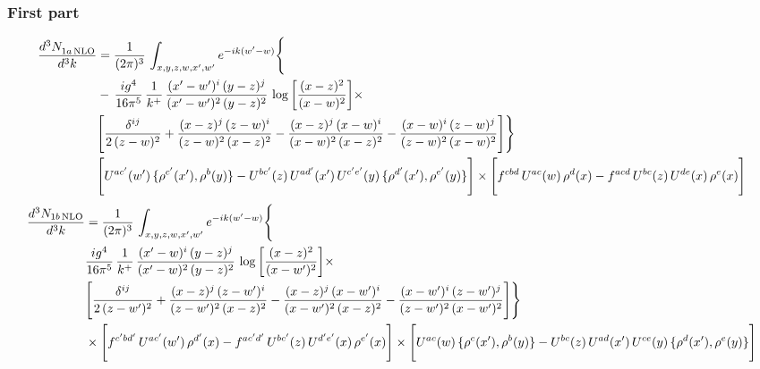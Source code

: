 \documentclass[9pt]{article}
\numberwithin{equation}{section}
\begin{document}
\subsubsection{First part}
\begin{align}
 \frac{d^{3}N_{1a\,\rm NLO}^{\rm}}{d^{3}k}  & =     \frac{1}{(2\pi)^{3}}\,\int_{x,y,z,w,x',w^{\prime}} e^{-ik(w^{\prime}-w)}\Bigg\{\notag \\
& -\, \frac{ig^{4}}{16\pi^{5}}\,\frac{1}{k^{+}}\, \frac{(x'-w')^{i}\,(y-z)^{j}}{(x'-w')^{2}\,(y-z)^{2}}\,\log{\left[\frac{(x-z)^{2}}{(x-w)^{2}}\right]}\times\notag \\ &  \Bigg[\frac{\delta^{ij}}{2\,(z-w)^{2}}+\frac{(x-z)^{j}\,(z-w)^{i}}{(z-w)^{2}\,(x-z)^{2}}-\frac{(x-z)^{j}\,(x-w)^{i}}{(x-w)^{2}\,(x-z)^{2}}-\frac{(x-w)^{i}\,(z-w)^{j}}{(z-w)^{2}\,(x-w)^{2}}\Bigg]\Bigg\} \notag \\ & \Bigg[U^{ac'}(w')\,\{\rho^{c'}(x'),\rho^{b}(y)\}-U^{bc'}(z)\,U^{ad'}(x')\,U^{c'e'}(y)\, \{\rho^{d'}(x'),\rho^{e'}(y)\}\Bigg]\times \Bigg[f^{cbd}\,U^{ac}(w)\,\rho^{d}(x)-f^{acd}\, U^{bc}(z)\,U^{de}(x)\,\rho^{e}(x)\Bigg]
\end{align}
\begin{align}
\frac{d^{3}N_{1b\, \rm NLO}}{d^{3}k} & =  \frac{1}{(2\pi)^{3}}\,\int_{x,y,z,w,x',w^{\prime}} e^{-ik(w^{\prime}-w)}\Bigg\{\notag \\
&  \frac{ig^{4}}{16\pi^{5}}\,\frac{1}{k^{+}}\, \frac{(x'-w)^{i}\,(y-z)^{j}}{(x'-w)^{2}\,(y-z)^{2}}\,\log{\left[\frac{(x-z)^{2}}{(x-w')^{2}}\right]}\times\notag \\ &  \Bigg[\frac{\delta^{ij}}{2\,(z-w')^{2}}+\frac{(x-z)^{j}\,(z-w')^{i}}{(z-w')^{2}\,(x-z)^{2}}-\frac{(x-z)^{j}\,(x-w')^{i}}{(x-w')^{2}\,(x-z)^{2}}-\frac{(x-w')^{i}\,(z-w')^{j}}{(z-w')^{2}\,(x-w')^{2}}\Bigg]\Bigg\} \notag \\ & \times\Bigg[f^{c'bd'}\,U^{ac'}(w')\,\rho^{d'}(x)-f^{ac'd'}\, U^{bc'}(z)\,U^{d'e'}(x)\,\rho^{e'}(x)\Bigg] \times \Bigg[U^{ac}(w)\,\{\rho^{c}(x'),\rho^{b}(y)\}-U^{bc}(z)\,U^{ad}(x')\,U^{ce}(y)\, \{\rho^{d}(x'),\rho^{e}(y)\}\Bigg]
\end{align}
\end{document}
